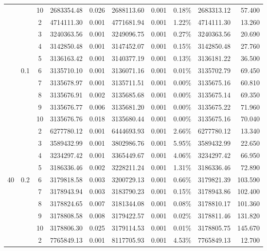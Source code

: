 {\begin{longtable}{cccrcrrcrr}
			&       & 10    & 2683354.48 & 0.026 & 2688113.60 & 0.001 & 0.18\% & 2683313.12 & 57.400 \\
			\cmidrule(r){3-10}
			&       & 2     & 4714111.30 & 0.001 & 4771681.94 & 0.001 & 1.22\% & 4714111.30 & 13.260 \\
			&       & 3     & 3240363.56 & 0.001 & 3249096.75 & 0.001 & 0.27\% & 3240363.56 & 20.690 \\
			&       & 4     & 3142850.48 & 0.001 & 3147452.07 & 0.001 & 0.15\% & 3142850.48 & 27.760 \\
			&       & 5     & 3136163.42 & 0.001 & 3140377.19 & 0.001 & 0.13\% & 3136181.22 & 36.500 \\
			& 0.1   & 6     & 3135710.10 & 0.001 & 3136071.16 & 0.001 & 0.01\% & 3135702.79 & 69.450 \\
			&       & 7     & 3135678.97 & 0.001 & 3135711.51 & 0.001 & 0.00\% & 3135675.16 & 60.810 \\
			&       & 8     & 3135676.91 & 0.002 & 3135685.68 & 0.001 & 0.00\% & 3135675.14 & 69.350 \\
			&       & 9     & 3135676.77 & 0.006 & 3135681.20 & 0.001 & 0.00\% & 3135675.22 & 71.960 \\
			&       & 10    & 3135676.76 & 0.018 & 3135680.44 & 0.001 & 0.00\% & 3135675.16 & 70.040 \\
			&       & 2     & 6277780.12 & 0.001 & 6444693.93 & 0.001 & 2.66\% & 6277780.12 & 13.340 \\
			&       & 3     & 3589432.99 & 0.001 & 3802986.76 & 0.001 & 5.95\% & 3589432.99 & 22.650 \\
			&       & 4     & 3234297.42 & 0.001 & 3365449.67 & 0.001 & 4.06\% & 3234297.42 & 66.950 \\
			&       & 5     & 3186336.46 & 0.002 & 3228211.24 & 0.001 & 1.31\% & 3186336.46 & 72.890 \\
	  40    & 0.2   & 6     & 3179818.58 & 0.003 & 3200729.13 & 0.001 & 0.66\% & 3179821.39 & 103.590 \\
			&       & 7     & 3178943.94 & 0.003 & 3183790.23 & 0.001 & 0.15\% & 3178943.86 & 102.400 \\
			&       & 8     & 3178824.65 & 0.007 & 3181344.08 & 0.001 & 0.08\% & 3178810.17 & 101.360 \\
			&       & 9     & 3178808.58 & 0.008 & 3179422.57 & 0.001 & 0.02\% & 3178811.46 & 131.820 \\
			&       & 10    & 3178806.30 & 0.025 & 3179114.53 & 0.001 & 0.01\% & 3178805.75 & 145.670 \\
			&       & 2     & 7765849.13 & 0.001 & 8117705.93 & 0.001 & 4.53\% & 7765849.13 & 12.700 \\

\end{longtable}}
